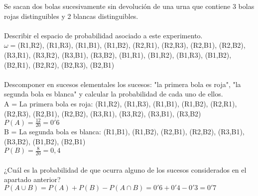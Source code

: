 \problem
Se sacan dos bolas sucesivamente sin devolución de una urna que contiene 3 bolas rojas distinguibles y 2 blancas distinguibles. \\ \\

\subproblem
Describir el espacio de probabilidad asociado a este experimento. \\
$\omega = ${(R1,R2), (R1,R3), (R1,B1), (R1,B2), (R2,R1), (R2,R3), (R2,B1), (R2,B2), (R3,R1), (R3,R2), (R3,B1), (R3,B2), (B1,R1), (B1,R2), (B1,R3), (B1,B2), (B2,R1), (B2,R2), (B2,R3), (B2,B1)} \\ \\

\subproblem
Descomponer en sucesos elementales los sucesos: "la primera bola es roja", "la segunda bola es blanca" y calcular la probabilidad de cada uno de ellos. \\
A = La primera bola es roja: {(R1,R2), (R1,R3), (R1,B1), (R1,B2), (R2,R1), (R2,R3), (R2,B1), (R2,B2), (R3,R1), (R3,R2), (R3,B1), (R3,B2)} \\
$P(A) = \frac{12}{20} = 0'6$ \\
B = La segunda bola es blanca: {(R1,B1), (R1,B2), (R2,B1), (R2,B2), (R3,B1), (R3,B2), (B1,B2), (B2,B1)} \\
$P(B) = \frac{8}{20} = 0,4$ \\ \\

\subproblem
¿Cuál es la probabilidad de que ocurra alguno de los sucesos considerados en el apartado anterior? \\
$P(A\cup B) = P(A)+P(B)-P(A\cap B) = 0'6 + 0'4 - 0'3 = 0'7$ \\ \\
